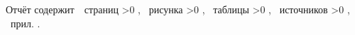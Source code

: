 \Referat

\hfill



Отчёт содержит \pageref{LastPage}\,~страниц%
    \ifnum \totfig >0
    , \totfig~рисунка%
    \fi
    \ifnum \tottab >0
    , \tottab~таблицы%
    \fi
    \ifnum \totbib >0
    , \totbib~источников%
    \fi
    \ifnum \totapp >0
    , \totapp~прил.%
    \else
    .%
    \fi

